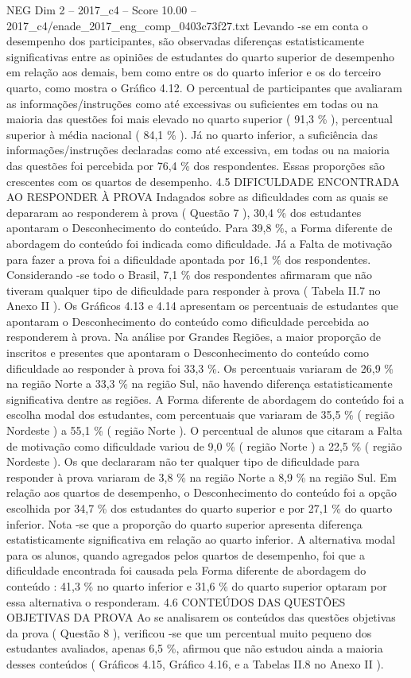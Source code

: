 \begin{textsample}{NEG Dim 2 – 2017\_c4 – Score 10.00 – 2017\_c4/enade\_2017\_eng\_comp\_0403c73f27.txt}
Levando -se em conta o desempenho dos participantes, são observadas diferenças estatisticamente significativas entre as opiniões de estudantes do quarto superior de desempenho em relação aos demais, bem como entre os do quarto inferior e os do terceiro quarto, como mostra o Gráfico 4.12.
O percentual de participantes que avaliaram as informações/instruções como até excessivas ou suficientes em todas ou na maioria das questões foi mais elevado no quarto superior ( 91,3 \% ), percentual superior à média nacional ( 84,1 \% ).
Já no quarto inferior, a suficiência das informações/instruções declaradas como até excessiva, em todas ou na maioria das questões foi percebida por 76,4 \% dos respondentes.
Essas proporções são crescentes com os quartos de desempenho. 4.5 DIFICULDADE ENCONTRADA AO RESPONDER À PROVA Indagados sobre as dificuldades com as quais se depararam ao responderem à prova ( Questão 7 ), 30,4 \% dos estudantes apontaram o Desconhecimento do conteúdo.
Para 39,8 \%, a Forma diferente de abordagem do conteúdo foi indicada como dificuldade.
Já a Falta de motivação para fazer a prova foi a dificuldade apontada por 16,1 \% dos respondentes.
Considerando -se todo o Brasil, 7,1 \% dos respondentes afirmaram que não tiveram qualquer tipo de dificuldade para responder à prova ( Tabela II.7 no Anexo II ).
Os Gráficos 4.13 e 4.14 apresentam os percentuais de estudantes que apontaram o Desconhecimento do conteúdo como dificuldade percebida ao responderem à prova.
Na análise por Grandes Regiões, a maior proporção de inscritos e presentes que apontaram o Desconhecimento do conteúdo como dificuldade ao responder à prova foi 33,3 \%.
Os percentuais variaram de 26,9 \% na região Norte a 33,3 \% na região Sul, não havendo diferença estatisticamente significativa dentre as regiões.
A Forma diferente de abordagem do conteúdo foi a escolha modal dos estudantes, com percentuais que variaram de 35,5 \% ( região Nordeste ) a 55,1 \% ( região Norte ).
O percentual de alunos que citaram a Falta de motivação como dificuldade variou de 9,0 \% ( região Norte ) a 22,5 \% ( região Nordeste ).
Os que declararam não ter qualquer tipo de dificuldade para responder à prova variaram de 3,8 \% na região Norte a 8,9 \% na região Sul.
Em relação aos quartos de desempenho, o Desconhecimento do conteúdo foi a opção escolhida por 34,7 \% dos estudantes do quarto superior e por 27,1 \% do quarto inferior.
Nota -se que a proporção do quarto superior apresenta diferença estatisticamente significativa em relação ao quarto inferior.
A alternativa modal para os alunos, quando agregados pelos quartos de desempenho, foi que a dificuldade encontrada foi causada pela Forma diferente de abordagem do conteúdo : 41,3 \% no quarto inferior e 31,6 \% do quarto superior optaram por essa alternativa o responderam. 4.6 CONTEÚDOS DAS QUESTÕES OBJETIVAS DA PROVA Ao se analisarem os conteúdos das questões objetivas da prova ( Questão 8 ), verificou -se que um percentual muito pequeno dos estudantes avaliados, apenas 6,5 \%, afirmou que não estudou ainda a maioria desses conteúdos ( Gráficos 4.15, Gráfico 4.16, e a Tabelas II.8 no Anexo II ).

\end{textsample}

